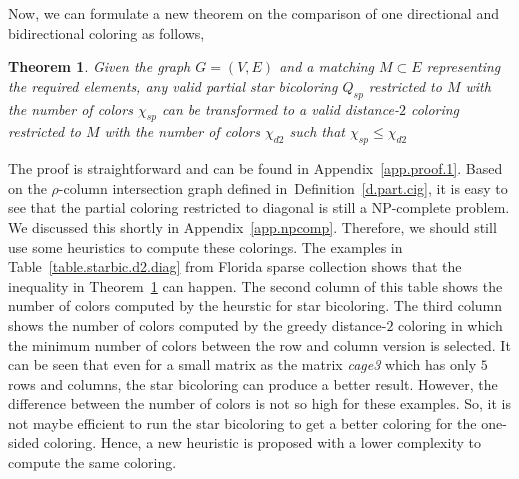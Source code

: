 \documentclass[12pt, twoside]{book}
\newtheorem{theorem}{Theorem}
\newcommand{\defref}[1]{Definition~\protect\ref{#1}}
\newcommand{\sparsifysymbol}{\ensuremath{\rho}}
\begin{document}
Now, we can formulate a new theorem on the comparison of one directional and
bidirectional coloring as follows,
\begin{theorem}
\label{t.matching}
Given the graph $G=(V,E)$ and a matching $M\subset E$ representing
the required elements, any valid partial star bicoloring $Q_{sp}$ restricted to $M$
with the number of colors $\chi_{sp}$
can be transformed to a valid distance-$2$ coloring restricted to $M$
with the number of colors $\chi_{d2}$ such that $\chi_{sp} \leq \chi_{d2}$
\end{theorem}
The proof is straightforward and can be found in Appendix~\ref{app.proof.1}.
Based on the $\sparsifysymbol$-column intersection graph defined in~\defref{d.part.cig},
it is easy to see
that the partial coloring restricted to diagonal is still a NP-complete problem.
We discussed this shortly in Appendix~\ref{app.npcomp}.
Therefore, we should still use some heuristics to compute these colorings.
The examples in Table~\ref{table.starbic.d2.diag} from Florida sparse collection shows that the 
inequality in Theorem~\ref{t.matching} can happen. The second column of this table
shows the number of colors computed by the heurstic for star bicoloring.
The third column shows the number of colors computed by the greedy distance-$2$ coloring
in which the minimum number of colors between the row and column version is selected.
It can be seen that even for a small matrix as the matrix \textit{cage3} which has only
$5$ rows and columns, the star bicoloring can produce a better result.
However, the difference between the number of colors is not so high for these examples. 
So, it is not maybe efficient to run the star bicoloring to get a better coloring for
the one-sided coloring. Hence, a new heuristic is proposed with a lower complexity 
to compute the same coloring. 
\end{document}
